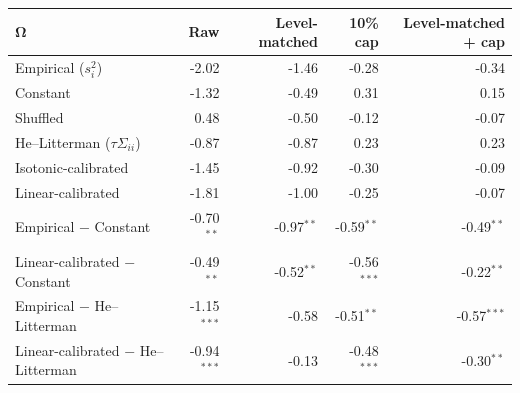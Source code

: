 \begin{tabular}{lrrrr}
\toprule
$\bm{\Omega}$ & Raw & Level-matched & 10\% cap & Level-matched + cap \\
\midrule
Empirical ($s_i^2$) & -2.02 & -1.46 & -0.28 & -0.34 \\
Constant & -1.32 & -0.49 & 0.31 & 0.15 \\
Shuffled & 0.48 & -0.50 & -0.12 & -0.07 \\
He--Litterman ($\tau\Sigma_{ii}$) & -0.87 & -0.87 & 0.23 & 0.23 \\
Isotonic-calibrated & -1.45 & -0.92 & -0.30 & -0.09 \\
Linear-calibrated & -1.81 & -1.00 & -0.25 & -0.07 \\
\midrule
Empirical $-$ Constant & -0.70$^{**}$ & -0.97$^{**}$ & -0.59$^{**}$ & -0.49$^{**}$ \\
Linear-calibrated $-$ Constant & -0.49$^{**}$ & -0.52$^{**}$ & -0.56$^{***}$ & -0.22$^{**}$ \\
Empirical $-$ He--Litterman & -1.15$^{***}$ & -0.58 & -0.51$^{**}$ & -0.57$^{***}$ \\
Linear-calibrated $-$ He--Litterman & -0.94$^{***}$ & -0.13 & -0.48$^{***}$ & -0.30$^{**}$ \\
\bottomrule
\end{tabular}
